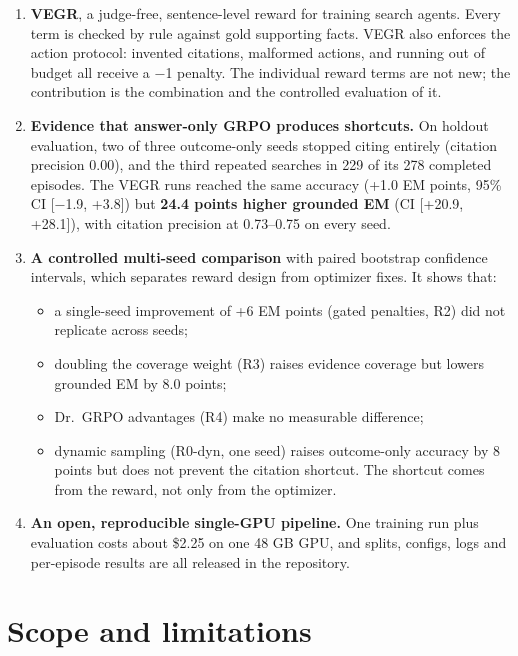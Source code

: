 \begin{enumerate}
\def\labelenumi{\arabic{enumi}.}
\tightlist
\item
  \textbf{VEGR}, a judge-free, sentence-level reward for training search
  agents. Every term is checked by rule against gold supporting facts.
  VEGR also enforces the action protocol: invented citations, malformed
  actions, and running out of budget all receive a −1 penalty. The
  individual reward terms are not new; the contribution is the
  combination and the controlled evaluation of it.
\item
  \textbf{Evidence that answer-only GRPO produces shortcuts.} On holdout
  evaluation, two of three outcome-only seeds stopped citing entirely
  (citation precision 0.00), and the third repeated searches in 229 of
  its 278 completed episodes. The VEGR runs reached the same accuracy
  (+1.0 EM points, 95\% CI {[}−1.9, +3.8{]}) but \textbf{24.4 points
  higher grounded EM} (CI {[}+20.9, +28.1{]}), with citation precision
  at 0.73--0.75 on every seed.
\item
  \textbf{A controlled multi-seed comparison} with paired bootstrap
  confidence intervals, which separates reward design from optimizer
  fixes. It shows that:

  \begin{itemize}
  \tightlist
  \item
    a single-seed improvement of +6 EM points (gated penalties, R2) did
    not replicate across seeds;
  \item
    doubling the coverage weight (R3) raises evidence coverage but
    lowers grounded EM by 8.0 points;
  \item
    Dr.~GRPO advantages (R4) make no measurable difference;
  \item
    dynamic sampling (R0-dyn, one seed) raises outcome-only accuracy by
    8 points but does not prevent the citation shortcut. The shortcut
    comes from the reward, not only from the optimizer.
  \end{itemize}
\item
  \textbf{An open, reproducible single-GPU pipeline.} One training run
  plus evaluation costs about \$2.25 on one 48 GB GPU, and splits,
  configs, logs and per-episode results are all released in the
  repository.
\end{enumerate}

\section{Scope and limitations}\label{sec:1.6}

